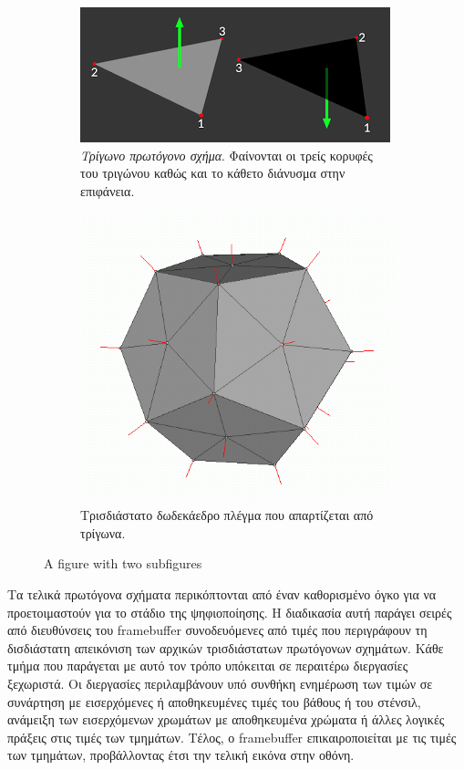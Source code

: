 \begin{figure}
	\label{fig:triangle_polyhedron_mesh}
	\centering
	\begin{subfigure}{.5\textwidth}
		\centering
		\includegraphics[width=.4\linewidth]{images/chapter2/triangle_normal.png}
		\caption[Τρίγωνο πρωτόγονο σχήμα]{\textsl{Τρίγωνο πρωτόγονο σχήμα}. Φαίνονται οι τρείς κορυφές του τριγώνου καθώς και το κάθετο διάνυσμα στην επιφάνεια.}
	\end{subfigure}%
	\begin{subfigure}{.5\textwidth}
		\label{fig:dodecahedron}
		\centering
		\includegraphics[width=.4\linewidth]{images/appendix/vertex_normal.png}
		\caption[Τρισδιάστατο δωδεκάεδρο πλέγμα]{Τρισδιάστατο δωδεκάεδρο πλέγμα που απαρτίζεται από τρίγωνα.	}
	\end{subfigure}
	\caption{A figure with two subfigures}
\end{figure}


Τα τελικά πρωτόγονα σχήματα περικόπτονται από έναν καθορισμένο όγκο για να προετοιμαστούν για το στάδιο της ψηφιοποίησης. Η διαδικασία αυτή παράγει σειρές από διευθύνσεις του framebuffer συνοδευόμενες από τιμές που περιγράφουν τη δισδιάστατη απεικόνιση των αρχικών τρισδιάστατων πρωτόγονων σχημάτων. Κάθε τμήμα που παράγεται με αυτό τον τρόπο υπόκειται σε περαιτέρω διεργασίες ξεχωριστά. Οι διεργασίες περιλαμβάνουν υπό συνθήκη ενημέρωση των τιμών σε συνάρτηση με εισερχόμενες ή αποθηκευμένες τιμές του βάθους ή του στένσιλ, ανάμειξη των εισερχόμενων χρωμάτων με αποθηκευμένα χρώματα ή άλλες λογικές πράξεις στις τιμές των τμημάτων. Τέλος, ο framebuffer επικαιροποιείται με τις τιμές των τμημάτων, προβάλλοντας έτσι την τελική εικόνα στην οθόνη.